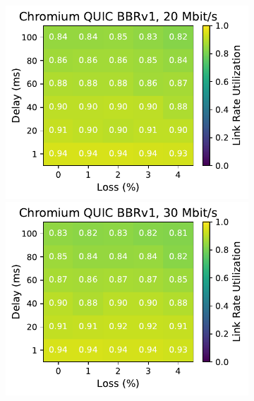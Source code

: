 \begin{figure}[ht]
\begin{subfigure}[b]{0.22\linewidth}
        \includegraphics[width=\linewidth,trim={0 0 2cm 0},clip]{splitting-paper/figures/heatmaps/heatmap_quic_bbr1_20mbps.pdf}
        \includegraphics[width=\linewidth,trim={0 0 2cm 0},clip]{splitting-paper/figures/heatmaps/heatmap_quic_bbr1_30mbps.pdf}

\end{subfigure}
\end{figure}

